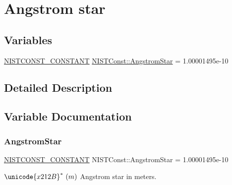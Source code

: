 \hypertarget{group___n_i_s_t_const-_angstrom_star}{}\section{Angstrom star}
\label{group___n_i_s_t_const-_angstrom_star}
\subsection*{Variables}
\begin{DoxyCompactItemize}
\item 
\mbox{\hyperlink{_n_i_s_t_const_8hpp_a2b0fc1d7452373f816175dd86ce26729}{N\+I\+S\+T\+C\+O\+N\+S\+T\+\_\+\+C\+O\+N\+S\+T\+A\+NT}} \mbox{\hyperlink{group___n_i_s_t_const-_angstrom_star_gaa47cd1d17183280540df63d68ceb8aac}{N\+I\+S\+T\+Const\+::\+Angstrom\+Star}} = 1.\+00001495e-\/10
\end{DoxyCompactItemize}


\subsection{Detailed Description}


\subsection{Variable Documentation}
\mbox{\label{group___n_i_s_t_const-_angstrom_star_gaa47cd1d17183280540df63d68ceb8aac}} 
\subsubsection{\texorpdfstring{Angstrom\+Star}{AngstromStar}}
{\footnotesize\ttfamily \mbox{\hyperlink{_n_i_s_t_const_8hpp_a2b0fc1d7452373f816175dd86ce26729}{N\+I\+S\+T\+C\+O\+N\+S\+T\+\_\+\+C\+O\+N\+S\+T\+A\+NT}} N\+I\+S\+T\+Const\+::\+Angstrom\+Star = 1.\+00001495e-\/10}

$\unicode{x212B}^{\ast} \ (m)$ Angstrom star in meters. 